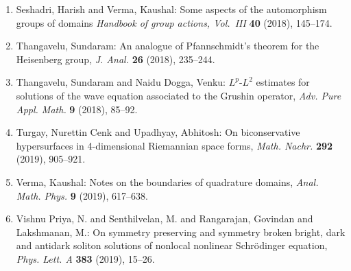 \begin{enumerate}[leftmargin=27pt]
	\item Seshadri, Harish and Verma, Kaushal: Some aspects of the automorphism groups of domains {\em Handbook of group actions, {V}ol.~{III}} {\bf 40} (2018), 145--174.

	\item Thangavelu, Sundaram: An analogue of {P}fannschmidt's theorem for the {H}eisenberg
	      group, {\em J. Anal.} {\bf 26} (2018), 235--244.

	\item Thangavelu, Sundaram and Naidu Dogga, Venku: {$L^p$}-{$L^2$} estimates for solutions of the wave equation
	      associated to the {G}rushin operator, {\em Adv. Pure Appl. Math.} {\bf 9} (2018), 85--92.

	\item Turgay, Nurettin Cenk and Upadhyay, Abhitosh: On biconservative hypersurfaces in 4-dimensional {R}iemannian
	      space forms, {\em Math. Nachr.} {\bf 292} (2019), 905--921.

	\item Verma, Kaushal: Notes on the boundaries of quadrature domains, {\em Anal. Math. Phys.} {\bf 9} (2019), 617--638.

	\item Vishnu Priya, N. and Senthilvelan, M. and  Rangarajan, Govindan
	      and Lakshmanan, M.: On symmetry preserving and symmetry broken bright, dark and
	      antidark soliton solutions of nonlocal nonlinear {S}chr\"{o}dinger
	      equation, {\em Phys. Lett. A} {\bf 383} (2019), 15--26.
\end{enumerate}

\vspace{-2.5mm}

